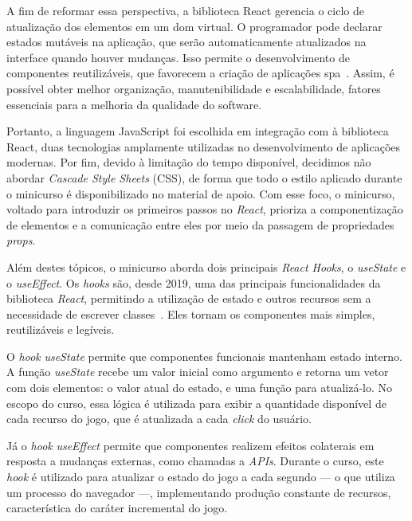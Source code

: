 A fim de reformar essa perspectiva, a biblioteca React gerencia o ciclo de atualização dos elementos em um \gls{dom} virtual.
O programador pode declarar estados mutáveis na aplicação, que serão automaticamente atualizados na interface quando houver mudanças.
Isso permite o desenvolvimento de componentes reutilizáveis, que favorecem a criação de aplicações \gls{spa}~\cite{meta:2025:thinking_in_react}.
Assim, é possível obter melhor organização, manutenibilidade e escalabilidade, fatores essenciais para a melhoria da qualidade do software.

Portanto, a linguagem JavaScript foi escolhida em integração com à biblioteca React, duas tecnologias amplamente utilizadas no desenvolvimento de aplicações modernas. Por fim, devido à limitação do tempo disponível, decidimos não abordar \textit{Cascade Style Sheets} (CSS), de forma que todo o estilo aplicado durante o minicurso é disponibilizado no material de apoio.
Com esse foco, o minicurso, voltado para introduzir os primeiros passos no \textit{React}, prioriza a componentização de elementos e a comunicação entre eles por meio da passagem de propriedades \textit{props}.

Além destes tópicos, o minicurso aborda dois principais \textit{React Hooks}, o \textit{useState} e o \textit{useEffect}.
Os \textit{hooks} são, desde 2019, uma das principais funcionalidades da biblioteca \textit{React}, permitindo a utilização de estado e outros recursos sem a necessidade de escrever classes~\cite{meta:2025:react_dom_hooks}. Eles tornam os componentes mais simples, reutilizáveis e legíveis.

O \textit{hook} \textit{useState} permite que componentes funcionais mantenham estado interno.
A função \textit{useState} recebe um valor inicial como argumento e retorna um vetor com dois elementos: o valor atual do estado, e uma função para atualizá-lo.
No escopo do curso, essa lógica é utilizada para exibir a quantidade disponível de cada recurso do jogo, que é atualizada a cada \textit{click} do usuário.

Já o \textit{hook} \textit{useEffect} permite que componentes realizem efeitos colaterais em resposta a mudanças externas, como chamadas a \textit{APIs}.
Durante o curso, este \textit{hook} é utilizado para atualizar o estado do jogo a cada segundo --- o que utiliza um processo do navegador ---, implementando produção constante de recursos, característica do caráter incremental do jogo.

